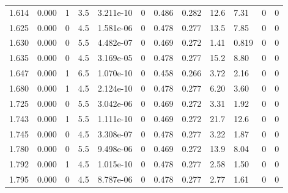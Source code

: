 \documentclass[preview]{standalone}
\begin{document}
{{{\begin{tabular}{L{1.2cm}C{1.2cm} C{0.3cm}C{0.5cm} C{1.4cm}C{1.4cm} C{1.4cm}C{1.4cm} C{1.6cm}C{1.6cm} C{1.6cm}C{1.6cm}}
  1.614  &  0.000  & 1     & 3.5 &  3.211e-10  & 0  &  0.486&   0.282& 12.6 & 7.31   &  0 & 0  \\ 
  1.625  &  0.000  & 0     & 4.5 &  1.581e-06  & 0  &  0.478&   0.277& 13.5 & 7.85   &  0 & 0  \\ 
  1.630  &  0.000  & 0     & 5.5 &  4.482e-07  & 0  &  0.469&   0.272& 1.41 & 0.819   &  0 & 0  \\ 
  1.635  &  0.000  & 0     & 4.5 &  3.169e-05  & 0  &  0.478&   0.277& 15.2 & 8.80   &  0 & 0  \\ 
  1.647  &  0.000  & 1     & 6.5 &  1.070e-10  & 0  &  0.458&   0.266& 3.72 & 2.16   &  0 & 0  \\ 
  1.680  &  0.000  & 1     & 4.5 &  2.124e-10  & 0  &  0.478&   0.277& 6.20 & 3.60   &  0 & 0  \\ 
  1.725  &  0.000  & 0     & 5.5 &  3.042e-06  & 0  &  0.469&   0.272& 3.31 & 1.92   &  0 & 0  \\ 
  1.743  &  0.000  & 1     & 5.5 &  1.111e-10  & 0  &  0.469&   0.272& 21.7 & 12.6   &  0 & 0  \\ 
  1.745  &  0.000  & 0     & 4.5 &  3.308e-07  & 0  &  0.478&   0.277& 3.22 & 1.87   &  0 & 0  \\ 
  1.780  &  0.000  & 0     & 5.5 &  9.498e-06  & 0  &  0.469&   0.272& 13.9 & 8.04   &  0 & 0  \\ 
  1.792  &  0.000  & 1     & 4.5 &  1.015e-10  & 0  &  0.478&   0.277& 2.58 & 1.50   &  0 & 0  \\ 
  1.795  &  0.000  & 0     & 4.5 &  8.787e-06  & 0  &  0.478&   0.277& 2.77 & 1.61   &  0 & 0  \\ 
\hline 
\end{tabular} 

}}}
\end{document}
